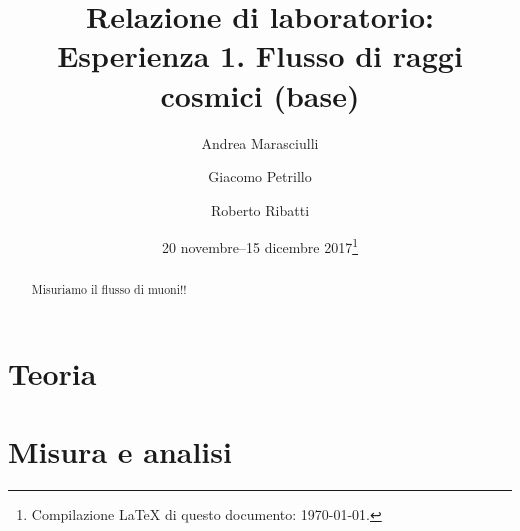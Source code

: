 \documentclass[a4paper]{article}
\title{Relazione di laboratorio:\\
Esperienza 1. Flusso di raggi cosmici (base)}
\author{Andrea Marasciulli
\and Giacomo Petrillo
\and Roberto Ribatti}
\date{20 novembre--15 dicembre 2017\footnote{Compilazione \LaTeX{} di questo documento: \today.}}
\begin{document}
\maketitle

\begin{abstract}
	Misuriamo il flusso di muoni!!
\end{abstract}

\tableofcontents



\section{Teoria}







\section{Misura e analisi}


\end{document}
